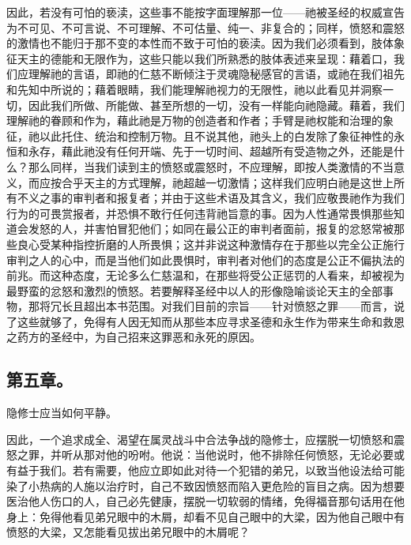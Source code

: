 因此，若没有可怕的亵渎，这些事不能按字面理解那一位——祂被圣经的权威宣告为不可见、不可言说、不可理解、不可估量、纯一、非复合的；同样，愤怒和震怒的激情也不能归于那不变的本性而不致于可怕的亵渎。因为我们必须看到，肢体象征天主的德能和无限作为，这些只能以我们所熟悉的肢体表述来呈现：藉着口，我们应理解祂的言语，即祂的仁慈不断倾注于灵魂隐秘感官的言语，或祂在我们祖先和先知中所说的；藉着眼睛，我们能理解祂视力的无限性，祂以此看见并洞察一切，因此我们所做、所能做、甚至所想的一切，没有一样能向祂隐藏。藉着，我们理解祂的眷顾和作为，藉此祂是万物的创造者和作者；手臂是祂权能和治理的象征，祂以此托住、统治和控制万物。且不说其他，祂头上的白发除了象征神性的永恒和永存，藉此祂没有任何开端、先于一切时间、超越所有受造物之外，还能是什么？那么同样，当我们读到主的愤怒或震怒时，不应理解，即按人类激情的不当意义，而应按合乎天主的方式理解，祂超越一切激情；这样我们应明白祂是这世上所有不义之事的审判者和报复者；并由于这些术语及其含义，我们应敬畏祂作为我们行为的可畏赏报者，并恐惧不敢行任何违背祂旨意的事。因为人性通常畏惧那些知道会发怒的人，并害怕冒犯他们；如同在最公正的审判者面前，报复的忿怒常被那些良心受某种指控折磨的人所畏惧；这并非说这种激情存在于那些以完全公正施行审判之人的心中，而是当他们如此畏惧时，审判者对他们的态度是公正不偏执法的前兆。而这种态度，无论多么仁慈温和，在那些将受公正惩罚的人看来，却被视为最野蛮的忿怒和激烈的愤怒。若要解释圣经中以人的形像隐喻谈论天主的全部事物，那将冗长且超出本书范围。对我们目前的宗旨——针对愤怒之罪——而言，说了这些就够了，免得有人因无知而从那些本应寻求圣德和永生作为带来生命和救恩之药方的圣经中，为自己招来这罪恶和永死的原因。\par


\subsection{第五章。}

隐修士应当如何平静。\par

因此，一个追求成全、渴望在属灵战斗中合法争战的隐修士，应摆脱一切愤怒和震怒之罪，并听从那对他的吩咐。他说：当他说时，他不排除任何愤怒，无论必要或有益于我们。若有需要，他应立即如此对待一个犯错的弟兄，以致当他设法给可能染了小热病的人施以治疗时，自己不致因愤怒而陷入更危险的盲目之病。因为想要医治他人伤口的人，自己必先健康，摆脱一切软弱的情绪，免得福音那句话用在他身上：免得他看见弟兄眼中的木屑，却看不见自己眼中的大梁，因为他自己眼中有愤怒的大梁，又怎能看见拔出弟兄眼中的木屑呢？\par

